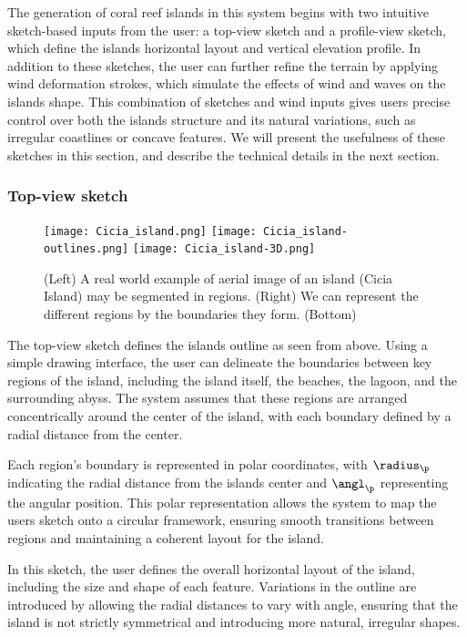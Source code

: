 The generation of coral reef islands in this system begins with two intuitive sketch-based inputs from the user: a top-view sketch and a profile-view sketch, which define the islands horizontal layout and vertical elevation profile. In addition to these sketches, the user can further refine the terrain by applying wind deformation strokes, which simulate the effects of wind and waves on the islands shape. This combination of sketches and wind inputs gives users precise control over both the islands structure and its natural variations, such as irregular coastlines or concave features. We will present the usefulness of these sketches in this section, and describe the technical details in the next section.

\subsubsection{Top-view sketch}

\begin{figure}[H]
	\centering
	\texttt{[image: Cicia\_island.png]}
	\texttt{[image: Cicia\_island-outlines.png]}
	\texttt{[image: Cicia\_island-3D.png]}
    \caption{(Left) A real world example of aerial image of an island (Cicia Island) may be segmented in regions. (Right) We can represent the different regions by the boundaries they form. (Bottom)  }
    \label{fig:coral-island_top-view-sketch}
\end{figure}

The top-view sketch defines the islands outline as seen from above. Using a simple drawing interface, the user can delineate the boundaries between key regions of the island, including the island itself, the beaches, the lagoon, and the surrounding abyss. The system assumes that these regions are arranged concentrically around the center of the island, with each boundary defined by a radial distance from the center.

Each region's boundary is represented in polar coordinates, with $\radius_\p$ indicating the radial distance from the islands center and $\angl_\p$ representing the angular position. This polar representation allows the system to map the users sketch onto a circular framework, ensuring smooth transitions between regions and maintaining a coherent layout for the island.

In this sketch, the user defines the overall horizontal layout of the island, including the size and shape of each feature. Variations in the outline are introduced by allowing the radial distances to vary with angle, ensuring that the island is not strictly symmetrical and introducing more natural, irregular shapes.

